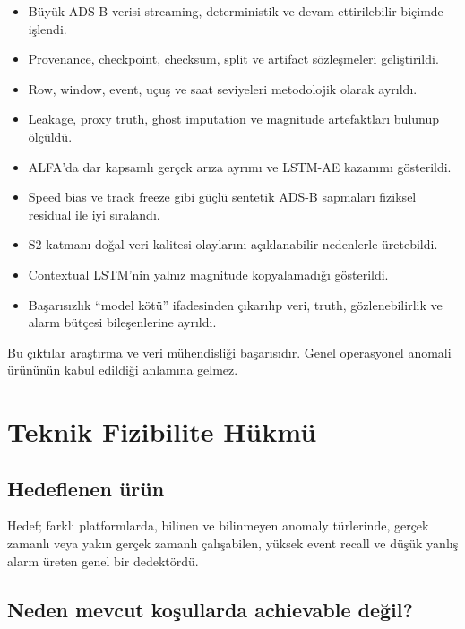 \documentclass[11pt,a4paper,oneside]{report}
\begin{document}
\begin{successbox}
\begin{itemize}
  \item Büyük ADS-B verisi streaming, deterministik ve devam ettirilebilir
  biçimde işlendi.
  \item Provenance, checkpoint, checksum, split ve artifact sözleşmeleri
  geliştirildi.
  \item Row, window, event, uçuş ve saat seviyeleri metodolojik olarak ayrıldı.
  \item Leakage, proxy truth, ghost imputation ve magnitude artefaktları
  bulunup ölçüldü.
  \item ALFA'da dar kapsamlı gerçek arıza ayrımı ve LSTM-AE kazanımı gösterildi.
  \item Speed bias ve track freeze gibi güçlü sentetik ADS-B sapmaları
  fiziksel residual ile iyi sıralandı.
  \item S2 katmanı doğal veri kalitesi olaylarını açıklanabilir nedenlerle
  üretebildi.
  \item Contextual LSTM'nin yalnız magnitude kopyalamadığı gösterildi.
  \item Başarısızlık ``model kötü'' ifadesinden çıkarılıp veri, truth,
  gözlenebilirlik ve alarm bütçesi bileşenlerine ayrıldı.
\end{itemize}
\end{successbox}

Bu çıktılar araştırma ve veri mühendisliği başarısıdır. Genel operasyonel
anomali ürününün kabul edildiği anlamına gelmez.

\chapter{Teknik Fizibilite Hükmü}

\section{Hedeflenen ürün}

Hedef; farklı platformlarda, bilinen ve bilinmeyen anomaly türlerinde,
gerçek zamanlı veya yakın gerçek zamanlı çalışabilen, yüksek event recall ve
düşük yanlış alarm üreten genel bir dedektördü.

\section{Neden mevcut koşullarda achievable değil?}
\end{document}

